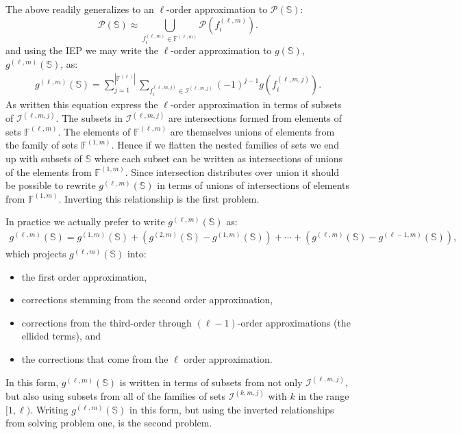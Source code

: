 \documentclass[11pt]{article}
\newcommand{\card}[1]{\left| #1\right|}
\newcommand{\gxn}[1]{g\left(#1\right)}
\newcommand{\pset}[1]{\mathcal{P}\left(#1\right)}
\newcommand{\fn}[1]{f^{(#1)}}
\newcommand{\ints}[1]{\mathcal{I}^{(#1)}}
\newcommand{\setf}{\mathbb{F}}
\newcommand{\setfn}[1]{\setf^{(#1)}}
\newcommand{\sets}{\mathbb{S}}
\newcommand{\gapprox}[1]{g^{(#1)}\left(\sets\right)}
\begin{document}
The above readily generalizes to an $\ell$-order approximation to 
$\pset{\sets}$:
\begin{equation}
	\pset{\sets} \approx 
	\bigcup_{\fn{\ell,m}_i\in\setfn{\ell,m}}\pset{\fn{\ell,m}_i}.
\end{equation}
and using the IEP we may write the $\ell$-order approximation to $\gxn{\sets}$, 
$\gapprox{\ell,m}$, as:
\begin{align}
	\gapprox{\ell,m} = \sum_{j=1}^{\card{\setfn{\ell}}}
	\sum_{\fn{\ell,m,j}_i\in\ints{\ell,m,j}} 
	\left(-1\right)^{j-1}\gxn{\fn{\ell,m,j}_i}.
\end{align}
As written this equation express the $\ell$-order approximation in terms of 
subsets of $\ints{\ell, m, j}$. The subsets in $\ints{\ell, m, j}$ are 
intersections formed from elements of sets $\setfn{\ell, m}$. The elements of 
$\setfn{\ell,m}$ are themselves unions of elements from the family of sets 
$\setfn{1,m}$. Hence if we flatten the nested families of sets we end up with 
subsets of $\sets$ where each subset can be written as intersections of unions 
of the elements from $\setfn{1,m}$. Since intersection distributes over union 
it should be possible to rewrite $\gapprox{\ell,m}$ in terms of unions of 
intersections of elements from $\setfn{1,m}$. Inverting this relationship is 
the first problem.

In practice we actually prefer to write 
$\gapprox{\ell,m}$ as:
\begin{align}
\gapprox{\ell,m} = \gapprox{1,m} + \left(\gapprox{2,m} - \gapprox{1,m}\right) + 
                   \cdots + 
                   \left(\gapprox{\ell,m} - \gapprox{\ell - 1,m}\right),
\end{align}
which projects $\gapprox{\ell,m}$ into: 
\begin{itemize}
	\item the first order approximation, 
    \item corrections stemming from the  second order approximation, 
    \item corrections from the third-order through $\left(\ell-1\right)$-order
          approximations (the ellided terms), and 
    \item the corrections that come from the $\ell$ order approximation. 
\end{itemize}    
In this form, $\gapprox{\ell,m}$ is written in terms of subsets from not only 
$\ints{\ell,m,j}$, but also using subsets from all of the families of sets 
$\ints{k, m, j}$ with $k$ in the range $[1, \ell)$. Writing $\gapprox{\ell,m}$ 
in this form, but using the inverted relationships from solving problem one, is 
the second problem.
\end{document}
